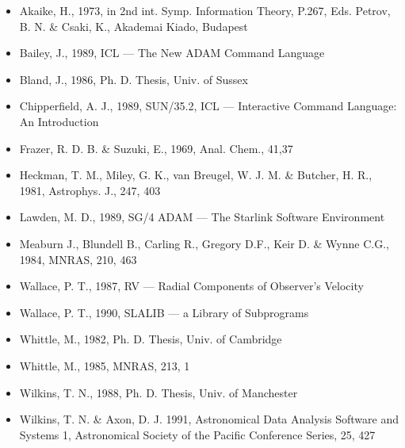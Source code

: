 \begin{itemize}

\item 
  Akaike, H., 1973, in 2nd int. Symp. Information Theory, P.267, Eds.
  Petrov, B. N. \& Csaki, K., Akademai Kiado, Budapest

\item 
  Bailey, J., 1989, ICL --- The New ADAM Command Language

\item 
  Bland, J., 1986, Ph. D. Thesis, Univ. of Sussex

\item 
  Chipperfield, A. J., 1989, SUN/35.2, ICL --- Interactive Command Language:
  An Introduction

\item 
  Frazer, R. D. B. \& Suzuki, E., 1969, Anal. Chem., 41,37

\item 
  Heckman, T. M., Miley, G. K., van Breugel, W. J. M. \& Butcher, H. R.,
  1981, Astrophys. J., 247, 403

\item 
  Lawden, M. D., 1989, SG/4 ADAM --- The Starlink Software Environment

\item 
  Meaburn J., Blundell B., Carling R., Gregory D.F., Keir D. \& Wynne C.G.,
  1984, MNRAS, 210, 463

\item 
  Wallace, P. T., 1987,  RV --- Radial Components of
  Observer's Velocity

\item 
  Wallace, P. T., 1990,  SLALIB --- a Library of
  Subprograms

\item 
  Whittle, M., 1982, Ph. D. Thesis, Univ. of Cambridge

\item 
  Whittle, M., 1985, MNRAS, 213, 1

\item 
  Wilkins, T. N., 1988, Ph. D. Thesis, Univ. of Manchester

\item 
  Wilkins, T. N. \& Axon, D. J. 1991, Astronomical Data Analysis
  Software and Systems 1, Astronomical Society of the Pacific Conference
  Series, 25, 427

\end{itemize}

%


